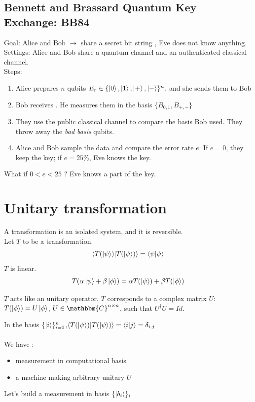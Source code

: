 \documentclass{article}
\begin{document}
\subsection{Bennett and Brassard Quantum Key Exchange: BB84}
Goal: Alice and Bob $\rightarrow$ share a secret bit string , Eve does not know
anything. \\
Settings: Alice and Bob share a quantum channel and an authenticated classical
channel. \\\noindent Steps:
\begin{enumerate}
    \item Alice prepares $n$ qubits $E_r \in \{\ket{0}, \ket{1}, \ket{+},
    \ket{-}\}^n$, and she sends them to Bob
    \item Bob receives . He measures them in the basis $\{B_{0,1}, B_{+,-}\}$
    \item They use the public classical channel to compare the basis Bob used.
    They throw away the \textit{bad basis} qubits.
    \item Alice and Bob sample the data and compare the error rate $e$. If
        $e=0$, they keep the key; if $e = 25\%$, Eve knows the key.
\end{enumerate}
What if $0 < e < 25$ ? Eve knows a part of the key.
\section{Unitary transformation}
A transformation is an isolated system, and it is reversible. \\
Let $T$ to be a transformation.
\begin{equation}
    \braket{T(\ket{\psi})|T(\ket{\psi})}=\braket{\psi|\psi}
\end{equation}
$T$ is linear.
\begin{equation}
    T(\alpha\ket{\psi} + \beta\ket{\phi}) = \alpha T(\ket{\psi}) + \beta T(\ket{\phi})
\end{equation}

$T$ acts like an unitary operator. $T$ corresponds to a complex matrix $U$:
$T(\ket{\phi}) = U\ket{\phi}$, $U \in \mathbbm{C}^{n \times n}$, such that
$U^\dagger U= Id$.

In the basis $\{\ket{i}\}_{i=0}^n$,$\braket{T(\ket{\psi})|T(\ket{\psi})} =
\braket{i|j} = \delta_{i,j}$
\\
\\
We have :
\begin{itemize}[label=-]
    \item measurement in computational basis
    \item a machine making arbitrary unitary $U$
\end{itemize}
Let's build a measurement in basis $\{\ket{b_i}\}_i$
\end{document}
